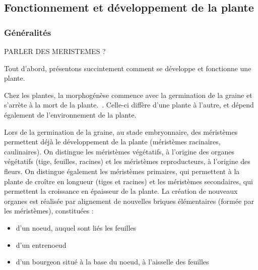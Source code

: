 \subsection{Fonctionnement et développement de la plante}

\subsubsection{Généralités}

PARLER DES MERISTEMES ?

Tout d'abord, présentons succintement comment se développe et fonctionne une plante. 

Chez les plantes, la morphogénèse commence avec la germination de la graine et s'arrète à la mort de la plante.~\cite[p.~22]{these_modelisation}.
Celle-ci diffère d'une plante à l'autre, et dépend également de l'environnement de la plante.

Lors de la germination de la graine, au stade embryonnaire, des méristèmes permettent déjà le développement de la plante (méristèmes racinaires, caulinaires).
On distingue les méristèmes végétatifs, à l’origine des organes végétatifs (tige, feuilles, racines) et les méristèmes reproducteurs, à l’origine des fleurs.
On distingue également les méristèmes primaires, qui permettent à la plante de croître en longueur (tiges et racines) et les méristèmes secondaires, qui permettent la croissance en épaisseur de la plante.
La création de nouveaux organes est réalisée par alignement de nouvelles briques élémentaires (formée par les méristèmes), constituées :
\begin{itemize}
	\item d'un noeud, auquel sont liés les feuilles
	\item d'un entrenoeud 
	\item d'un bourgeon situé à la base du noeud, à l'aisselle des feuilles
\end{itemize} 




